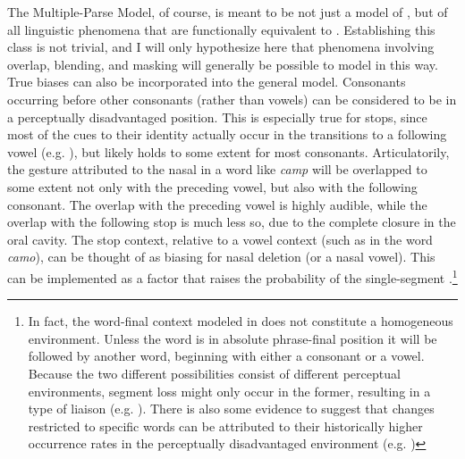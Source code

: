 The Multiple-Parse Model, of course, is meant to be not just a model
of , but of all linguistic phenomena that are functionally
equivalent to . Establishing this class is not trivial,
and I will only hypothesize here that phenomena involving 
overlap,  blending, and  masking will generally
be possible to model in this way. True  biases can also be
incorporated into the general model. Consonants occurring before other
consonants (rather than vowels) can be considered to be in a perceptually
disadvantaged position. This is especially true for stops, since most
of the cues to their identity actually occur in the transitions to
a following vowel (e.g. \citealt{liberman1954role}), but likely
holds to some extent for most consonants. Articulatorily, the 
gesture attributed to the nasal in a word like \textit{camp} will be
overlapped to some extent not only with the preceding vowel, but also
with the following consonant. The overlap with the preceding vowel
is highly audible, while the overlap with the following stop is much
less so, due to the complete closure in the oral cavity. The stop
context, relative to a vowel context (such as in the word \textit{camo}),
can be thought of as biasing for nasal deletion (or a nasal vowel).
This can be implemented as a factor that raises the probability of
the single-segment .\footnote{In fact, the word-final context modeled in 
does not constitute a homogeneous  environment. Unless the
 word is in absolute phrase-final position it will be followed
by another word, beginning with either a consonant or a vowel. Because
the two different possibilities consist of different perceptual environments,
segment loss might only occur in the former, resulting in a type of
liaison (e.g. \citealt{Tranel1981}). There is also some evidence
to suggest that changes restricted to specific words can be attributed
to their historically higher occurrence rates in the perceptually
disadvantaged environment (e.g. \citealt{brown2012discourse})}


